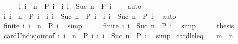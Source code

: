 \begin{isabellebody}
%
\isadelimproof
%
\endisadelimproof
%
\isatagproof
{}\isamarkupfalse%
\ {\isacharminus}\isanewline
\ \ \isamarkupfalse%
\ {\isacartoucheopen}{\isacharbraceleft}i{\isachardot}\ i\ {\isasymle}\ n\ {\isasymand}\ P\ i{\isacharbraceright}\ {\isasyminter}\ {\isacharbraceleft}i{\isachardot}\ i\ {\isacharequal}\ {\isacharparenleft}Suc\ n{\isacharparenright}\ {\isasymand}\ P\ i{\isacharbraceright}\ {\isacharequal}\ {\isacharbraceleft}{\isacharbraceright}{\isacartoucheclose}\ \isamarkupfalse%
\ auto\isanewline
\ \ \isamarkupfalse%
\ \isamarkupfalse%
\ {\isacartoucheopen}{\isacharbraceleft}i{\isachardot}\ i\ {\isasymle}\ n\ {\isasymand}\ P\ i{\isacharbraceright}\ {\isasymunion}\ {\isacharbraceleft}i{\isachardot}\ i\ {\isacharequal}\ {\isacharparenleft}Suc\ n{\isacharparenright}\ {\isasymand}\ P\ i{\isacharbraceright}\ {\isacharequal}\ {\isacharbraceleft}i{\isachardot}\ i\ {\isasymle}\ {\isacharparenleft}Suc\ n{\isacharparenright}\ {\isasymand}\ P\ i{\isacharbraceright}{\isacartoucheclose}\ \isamarkupfalse%
\ auto\isanewline
\ \ \isamarkupfalse%
\ \isamarkupfalse%
\ {\isacartoucheopen}finite\ {\isacharbraceleft}i{\isachardot}\ i\ {\isasymle}\ n\ {\isasymand}\ P\ i{\isacharbraceright}{\isacartoucheclose}\ \isamarkupfalse%
\ simp\isanewline
\ \ \isamarkupfalse%
\ \isamarkupfalse%
\ {\isacartoucheopen}finite\ {\isacharbraceleft}i{\isachardot}\ i\ {\isacharequal}\ {\isacharparenleft}Suc\ n{\isacharparenright}\ {\isasymand}\ P\ i{\isacharbraceright}{\isacartoucheclose}\ \isamarkupfalse%
\ simp\isanewline
\ \ \isamarkupfalse%
\ \isamarkupfalse%
\ {\isacharquery}thesis\ \isamarkupfalse%
\ card{\isacharunderscore}Un{\isacharunderscore}disjoint{\isacharbrackleft}of\ {\isacartoucheopen}{\isacharbraceleft}i{\isachardot}\ i\ {\isasymle}\ n\ {\isasymand}\ P\ i{\isacharbraceright}{\isacartoucheclose}\ {\isacartoucheopen}{\isacharbraceleft}i{\isachardot}\ i\ {\isacharequal}\ Suc\ n\ {\isasymand}\ P\ i{\isacharbraceright}{\isacartoucheclose}{\isacharbrackright}\ \isamarkupfalse%
\ simp\isanewline
{}\isamarkupfalse%
%
\endisatagproof
{\isafoldproof}%
%
\isadelimproof
\isanewline
%
\endisadelimproof
\isanewline
{}\isamarkupfalse%
\ card{\isacharunderscore}le{\isacharunderscore}leq{\isacharcolon}\isanewline
\ \ \ {\isacartoucheopen}m\ {\isacharless}\ n{\isacartoucheclose}\isanewline

\end{isabellebody}
